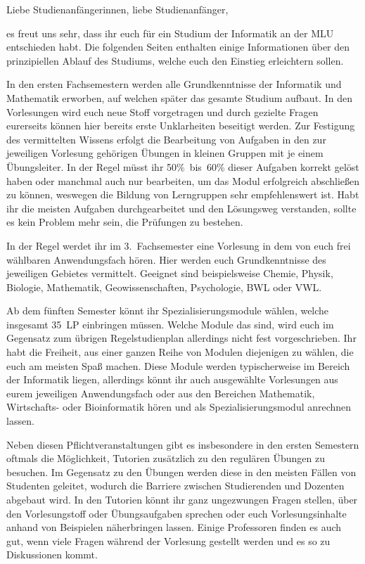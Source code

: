 Liebe Studienanfängerinnen, liebe Studienanfänger,

es freut uns sehr, dass ihr euch für ein Studium der Informatik an der MLU entschieden habt. Die folgenden Seiten enthalten einige Informationen über den prinzipiellen Ablauf des Studiums, welche euch den Einstieg erleichtern sollen.\par

In den ersten Fachsemestern werden alle Grundkenntnisse der Informatik und Mathematik erworben, auf welchen später das gesamte Studium aufbaut.
In den Vorlesungen wird euch neue Stoff vorgetragen und durch gezielte Fragen eurerseits können hier bereits erste Unklarheiten beseitigt werden.
Zur Festigung des vermittelten Wissens erfolgt die Bearbeitung von Aufgaben in den zur jeweiligen Vorlesung gehörigen Übungen in kleinen Gruppen mit je einem Übungsleiter.
In der Regel müsst ihr 50\%~bis~60\% dieser Aufgaben korrekt gelöst haben oder manchmal auch nur bearbeiten, um das Modul erfolgreich abschließen zu können, weswegen die Bildung von Lerngruppen sehr empfehlenswert ist.
Habt ihr die meisten Aufgaben durchgearbeitet und den Lösungsweg verstanden, sollte es kein Problem mehr sein, die Prüfungen zu bestehen.

In der Regel werdet ihr im 3.~Fachsemester eine Vorlesung in dem von euch frei wählbaren Anwendungsfach hören.
Hier werden euch Grundkenntnisse des jeweiligen Gebietes vermittelt.
Geeignet sind beispielsweise Chemie, Physik, Biologie, Mathematik, Geowissenschaften, Psychologie, BWL oder VWL.

Ab dem fünften Semester könnt ihr Spezialisierungsmodule wählen, welche insgesamt 35~LP einbringen müssen.
Welche Module das sind, wird euch im Gegensatz zum übrigen Regelstudienplan allerdings nicht fest vorgeschrieben.
Ihr habt die Freiheit, aus einer ganzen Reihe von Modulen diejenigen zu wählen, die euch am meisten Spaß machen.
Diese Module werden typischerweise im Bereich der Informatik liegen, allerdings könnt ihr auch ausgewählte Vorlesungen aus eurem jeweiligen Anwendungsfach oder aus den Bereichen Mathematik, Wirtschafts- oder Bioinformatik hören und als Spezialisierungsmodul anrechnen lassen.

Neben diesen Pflichtveranstaltungen gibt es insbesondere in den ersten Semestern oftmals die Möglichkeit, Tutorien zusätzlich zu den regulären Übungen zu besuchen.
Im Gegensatz zu den Übungen werden diese in den meisten Fällen von Studenten geleitet, wodurch die Barriere zwischen Studierenden und Dozenten abgebaut wird.
In den Tutorien könnt ihr ganz ungezwungen Fragen stellen, über den Vorlesungstoff oder Übungsaufgaben sprechen oder euch Vorlesungsinhalte anhand von Beispielen näherbringen lassen. Einige Professoren finden es auch gut, wenn viele Fragen während der Vorlesung gestellt werden und es so zu Diskussionen kommt.

